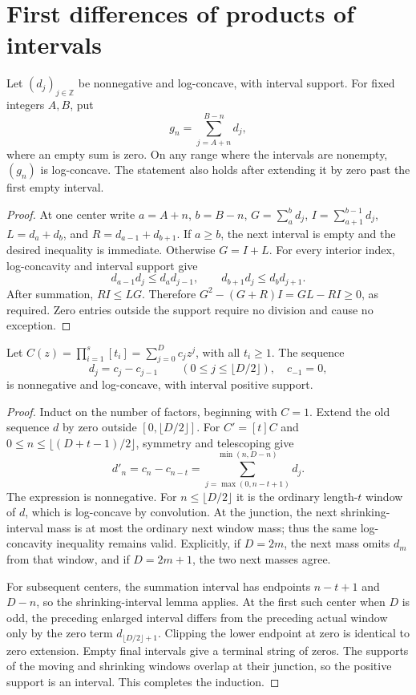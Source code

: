 \section{First differences of products of intervals}
\begin{lemma}
Let $(d_j)_{j\in\mathbb Z}$ be nonnegative and log-concave, with
interval support. For fixed integers $A,B$, put
\[
 g_n=\sum_{j=A+n}^{B-n}d_j,
\]
where an empty sum is zero. On any range where the intervals are
nonempty, $(g_n)$ is log-concave. The statement also holds after
extending it by zero past the first empty interval.
\end{lemma}
\begin{proof}
At one center write $a=A+n$, $b=B-n$, $G=\sum_a^b d_j$,
$I=\sum_{a+1}^{b-1}d_j$, $L=d_a+d_b$, and
$R=d_{a-1}+d_{b+1}$. If $a\ge b$, the next interval is empty
and the desired inequality is immediate. Otherwise $G=I+L$.
For every interior index, log-concavity and interval support give
\[
 d_{a-1}d_j\le d_a d_{j-1},\qquad
 d_{b+1}d_j\le d_b d_{j+1}.
\]
After summation, $RI\le LG$. Therefore
$G^2-(G+R)I=GL-RI\ge0$, as required. Zero entries outside
the support require no division and cause no exception.
\end{proof}

\begin{theorem}
Let $C(z)=\prod_{i=1}^s[t_i]=\sum_{j=0}^D c_jz^j$, with all
$t_i\ge1$. The sequence
\[
 d_j=c_j-c_{j-1}\qquad
 (0\le j\le\lfloor D/2\rfloor),\quad c_{-1}=0,
\]
is nonnegative and log-concave, with interval positive support.
\end{theorem}
\begin{proof}
Induct on the number of factors, beginning with $C=1$.
Extend the old sequence $d$ by zero outside
$[0,\lfloor D/2\rfloor]$. For $C'=[t]C$ and
$0\le n\le\lfloor(D+t-1)/2\rfloor$, symmetry and telescoping give
\[
 d'_n=c_n-c_{n-t}
     =\sum_{j=\max(0,n-t+1)}^{\min(n,D-n)}d_j.
\]
The expression is nonnegative. For $n\le\lfloor D/2\rfloor$
it is the ordinary length-$t$ window of $d$, which is log-concave
by convolution. At the junction, the next shrinking-interval mass
is at most the ordinary next window mass; thus the same
log-concavity inequality remains valid. Explicitly, if $D=2m$,
the next mass omits $d_m$ from that window, and if $D=2m+1$,
the two next masses agree.

For subsequent centers, the summation interval has endpoints
$n-t+1$ and $D-n$, so the shrinking-interval lemma applies.
At the first such center when $D$ is odd, the preceding enlarged
interval differs from the preceding actual window only by the
zero term $d_{\lfloor D/2\rfloor+1}$. Clipping the lower endpoint
at zero is identical to zero extension. Empty final intervals
give a terminal string of zeros. The supports of the moving and
shrinking windows overlap at their junction, so the positive
support is an interval. This completes the induction.
\end{proof}


